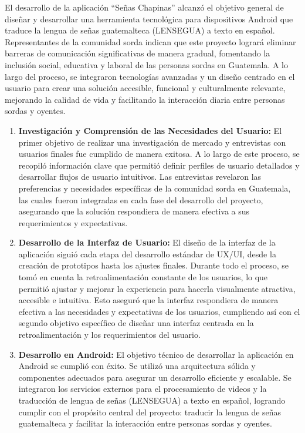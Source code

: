 El desarrollo de la aplicación ``Señas Chapinas''  alcanzó el objetivo general de diseñar y desarrollar una herramienta tecnológica para dispositivos Android que traduce la lengua de señas guatemalteca (LENSEGUA) a texto en español. Representantes de la comunidad sorda indican que este proyecto logrará eliminar barreras de comunicación significativas de manera gradual, fomentando la inclusión social, educativa y laboral de las personas sordas en Guatemala. A lo largo del proceso, se integraron tecnologías avanzadas y un diseño centrado en el usuario para crear una solución accesible, funcional y culturalmente relevante, mejorando la calidad de vida y facilitando la interacción diaria entre personas sordas y oyentes.

\begin{enumerate}
    \item \textbf{Investigación y Comprensión de las Necesidades del Usuario:} El primer objetivo de realizar una investigación de mercado y entrevistas con usuarios finales fue cumplido de manera exitosa. A lo largo de este proceso, se recopiló información clave que permitió definir perfiles de usuario detallados y desarrollar flujos de usuario intuitivos. Las entrevistas revelaron las preferencias y necesidades específicas de la comunidad sorda en Guatemala, las cuales fueron integradas en cada fase del desarrollo del proyecto, asegurando que la solución respondiera de manera efectiva a sus requerimientos y expectativas.
    
    \item \textbf{Desarrollo de la Interfaz de Usuario:} El diseño de la interfaz de la aplicación siguió cada etapa del desarrollo estándar de UX/UI, desde la creación de prototipos hasta los ajustes finales. Durante todo el proceso, se tomó en cuenta la retroalimentación constante de los usuarios, lo que permitió ajustar y mejorar la experiencia para hacerla visualmente atractiva, accesible e intuitiva. Esto aseguró que la interfaz respondiera de manera efectiva a las necesidades y expectativas de los usuarios, cumpliendo así con el segundo objetivo específico de diseñar una interfaz centrada en la retroalimentación y los requerimientos del usuario.
    
    \item \textbf{Desarrollo en Android:}  El objetivo técnico de desarrollar la aplicación en Android se cumplió con éxito. Se utilizó una arquitectura sólida y componentes adecuados para asegurar un desarrollo eficiente y escalable. Se  integraron los servicios externos para el procesamiento de videos y la traducción de lengua de señas (LENSEGUA) a texto en español, logrando cumplir con el propósito central del proyecto: traducir la lengua de señas guatemalteca y facilitar la interacción entre personas sordas y oyentes.


    
\end{enumerate}

